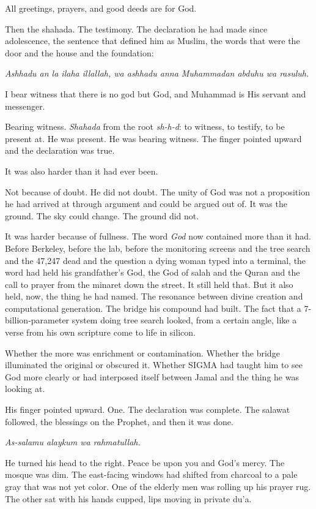 All greetings, prayers, and good deeds are for God.

Then the shahada. The testimony. The declaration he had made since adolescence, the sentence that defined him as Muslim, the words that were the door and the house and the foundation:

\emph{Ashhadu an la ilaha illallah, wa ashhadu anna Muhammadan abduhu wa rasuluh.}

I bear witness that there is no god but God, and Muhammad is His servant and messenger.

Bearing witness. \emph{Shahada} from the root \emph{sh-h-d}: to witness, to testify, to be present at. He was present. He was bearing witness. The finger pointed upward and the declaration was true.

It was also harder than it had ever been.

Not because of doubt. He did not doubt. The unity of God was not a proposition he had arrived at through argument and could be argued out of. It was the ground. The sky could change. The ground did not.

It was harder because of fullness. The word \emph{God} now contained more than it had. Before Berkeley, before the lab, before the monitoring screens and the tree search and the 47,247 dead and the question a dying woman typed into a terminal, the word had held his grandfather's God, the God of salah and the Quran and the call to prayer from the minaret down the street. It still held that. But it also held, now, the thing he had named. The resonance between divine creation and computational generation. The bridge his compound had built. The fact that a 7-billion-parameter system doing tree search looked, from a certain angle, like a verse from his own scripture come to life in silicon.

Whether the more was enrichment or contamination. Whether the bridge illuminated the original or obscured it. Whether SIGMA had taught him to see God more clearly or had interposed itself between Jamal and the thing he was looking at.

His finger pointed upward. One. The declaration was complete. The salawat followed, the blessings on the Prophet, and then it was done.


\emph{As-salamu alaykum wa rahmatullah.}

He turned his head to the right. Peace be upon you and God's mercy. The mosque was dim. The east-facing windows had shifted from charcoal to a pale gray that was not yet color. One of the elderly men was rolling up his prayer rug. The other sat with his hands cupped, lips moving in private du'a.

